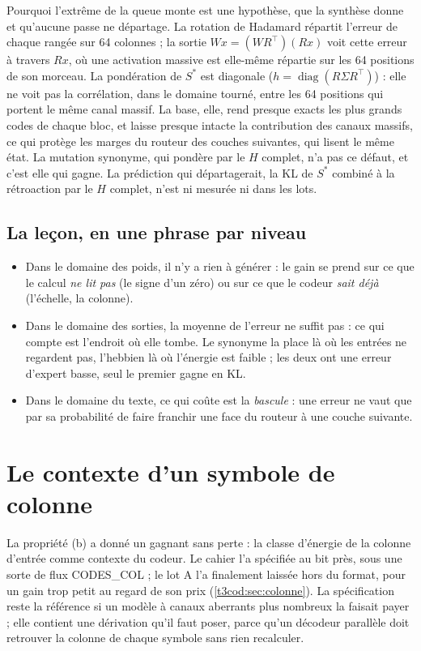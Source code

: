 Pourquoi l'extrême de la queue monte est une hypothèse, que la synthèse donne et qu'aucune passe ne départage. La rotation de Hadamard répartit l'erreur de chaque rangée sur 64 colonnes ; la sortie $Wx = (WR^{\top})(Rx)$ voit cette erreur à travers $Rx$, où une activation massive est elle-même répartie sur les 64 positions de son morceau. La pondération de $S^{*}$ est diagonale ($h = \operatorname{diag}(R\Sigma R^{\top})$) : elle ne voit pas la corrélation, dans le domaine tourné, entre les 64 positions qui portent le même canal massif. La base, elle, rend presque exacts les plus grands codes de chaque bloc, et laisse presque intacte la contribution des canaux massifs, ce qui protège les marges du routeur des couches suivantes, qui lisent le même état. La mutation synonyme, qui pondère par le $H$ complet, n'a pas ce défaut, et c'est elle qui gagne. La prédiction qui départagerait, la KL de $S^{*}$ combiné à la rétroaction par le $H$ complet, n'est ni mesurée ni dans les lots.

\subsection{La leçon, en une phrase par niveau}

\begin{itemize}
\item Dans le domaine des poids, il n'y a rien à générer : le gain se prend sur ce que le calcul \emph{ne lit pas} (le signe d'un zéro) ou sur ce que le codeur \emph{sait déjà} (l'échelle, la colonne).
\item Dans le domaine des sorties, la moyenne de l'erreur ne suffit pas : ce qui compte est l'endroit où elle tombe. Le synonyme la place là où les entrées ne regardent pas, l'hebbien là où l'énergie est faible ; les deux ont une erreur d'expert basse, seul le premier gagne en KL.
\item Dans le domaine du texte, ce qui coûte est la \emph{bascule} : une erreur ne vaut que par sa probabilité de faire franchir une face du routeur à une couche suivante.
\end{itemize}

\section{Le contexte d'un symbole de colonne}\label{t3syn:sec:codes-col}

La propriété (b) a donné un gagnant sans perte : la classe d'énergie de la colonne d'entrée comme contexte du codeur. Le cahier l'a spécifiée au bit près, sous une sorte de flux CODES\_COL ; le lot A l'a finalement laissée hors du format, pour un gain trop petit au regard de son prix (\cref{t3cod:sec:colonne}). La spécification reste la référence si un modèle à canaux aberrants plus nombreux la faisait payer ; elle contient une dérivation qu'il faut poser, parce qu'un décodeur parallèle doit retrouver la colonne de chaque symbole sans rien recalculer.

